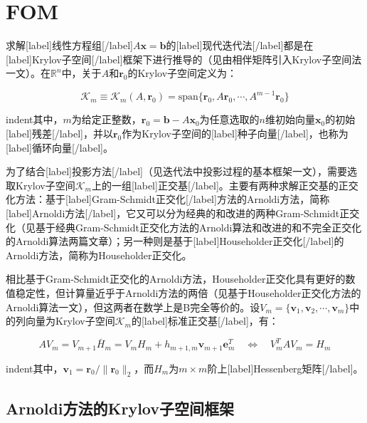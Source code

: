 \documentclass[UTF8,nofonts]{ctexart}
\begin{document}

\section*{FOM}


求解[label]线性方程组[/label]$A\boldsymbol{x}=\boldsymbol{b}$的[label]现代迭代法[/label]都是在[label]Krylov子空间[/label]框架下进行推导的（见由相伴矩阵引入Krylov子空间法一文）。在$\mathbb{R}^n$中，关于$A$和$\boldsymbol{r}_0$的Krylov子空间定义为：

\[
\mathcal{K}_m\equiv\mathcal{K}_{m}(A,\boldsymbol{r}_0)=
\text{span}\{\boldsymbol{r}_0,A\boldsymbol{r}_0,\cdots,A^{m-1}\boldsymbol{r}_0\}
\]

indent其中，$m$为给定正整数，$\boldsymbol{r}_0=\boldsymbol{b}-A\boldsymbol{x}_0$为任意选取的$n$维初始向量$\boldsymbol{x}_0$的初始[label]残差[/label]，并以$\boldsymbol{r}_0$作为Krylov子空间的[label]种子向量[/label]，也称为[label]循环向量[/label]。

为了结合[label]投影方法[/label]（见迭代法中投影过程的基本框架一文），需要选取Krylov子空间$\mathcal{K}_m$上的一组[label]正交基[/label]。主要有两种求解正交基的正交化方法：基于[label]Gram-Schmidt正交化[/label]方法的Arnoldi方法，简称[label]Arnoldi方法[/label]，它又可以分为经典的和改进的两种Gram-Schmidt正交化（见基于经典Gram-Schmidt正交化方法的Arnoldi算法和改进的和不完全正交化的Arnoldi算法两篇文章）；另一种则是基于[label]Householder正交化[/label]的Arnoldi方法，简称为Householder正交化。

相比基于Gram-Schmidt正交化的Arnoldi方法，Householder正交化具有更好的数值稳定性，但计算量近乎于Arnoldi方法的两倍（见基于Householder正交化方法的Arnoldi算法一文），但这两者在数学上是B完全等价的。设$V_m=\{\boldsymbol{v}_1,\boldsymbol{v}_2,\cdots,\boldsymbol{v}_m\}$中的列向量为Krylov子空间$\mathcal{K}_m$的[label]标准正交基[/label]，有：

\begin{equation}
\label{eq:avvh}
AV_m=V_{m+1}\bar{H}_m=V_mH_m+h_{m+1,m}\boldsymbol{v}_{m+1}\boldsymbol{e}_m^T
\quad\Longleftrightarrow\quad
V_m^TAV_m=H_m
\end{equation}

indent其中，$\boldsymbol{v}_1=\boldsymbol{r}_0/\|\boldsymbol{r}_0\|_2$，而$H_m$为$m \times m$阶上[label]Hessenberg矩阵[/label]。

\subsection*{Arnoldi方法的Krylov子空间框架}
\end{document}
